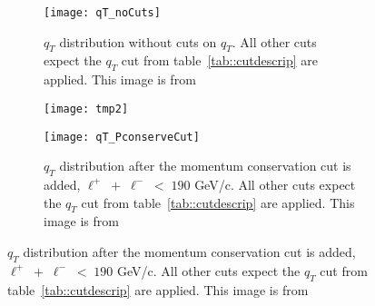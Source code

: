\begin{figure}[h!t]
  \centering
  \begin{subfigure}{.46\textwidth}
    \centering \texttt{[image: qT\_noCuts]}
    \caption{$q_T$ distribution without cuts on $q_T$.  All other cuts expect
      the $q_T$ cut from table~\ref{tab::cutdescrip} are applied.  This image is
      from~\cite{janthesis}}
    \label{fig::qT_noCuts}
  \end{subfigure}%
  \begin{subfigure}{.02\textwidth}
    \centering
    \texttt{[image: tmp2]}
    \label{fig::tmp2}%
  \end{subfigure}
  \begin{subfigure}{.46\textwidth}
    \centering \texttt{[image: qT\_PconserveCut]}
    \caption{$q_T$ distribution after the momentum conservation cut is added,
      $\ell^+ \; + \; \ell^- \; < \; 190$ GeV/c.  All other cuts expect the
      $q_T$ cut from table~\ref{tab::cutdescrip} are applied.  This image is
      from~\cite{janthesis}}
    \label{fig::qT_PconserveCut}
  \end{subfigure}
\end{figure}


